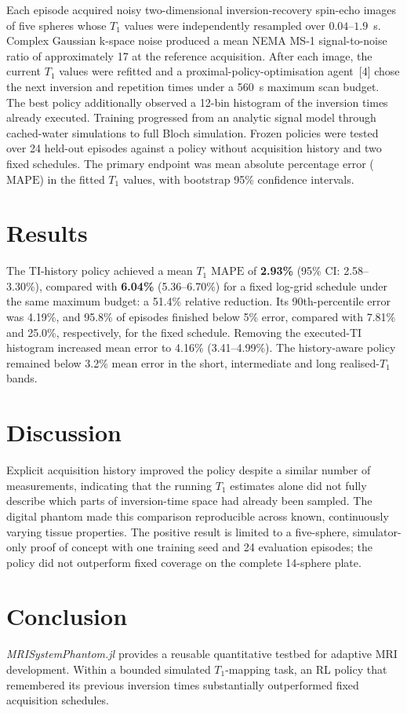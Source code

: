 \documentclass[10pt,a4paper]{article}
\newcommand{\mape}{\mathrm{MAPE}}
\begin{document}
Each episode acquired noisy two-dimensional inversion-recovery spin-echo images
of five spheres whose $T_1$ values were independently resampled over
$0.04$--$1.9$~s. Complex Gaussian k-space noise produced a mean NEMA MS-1 signal-to-noise
ratio of approximately 17 at the reference acquisition. After each image, the
current $T_1$ values were refitted and a proximal-policy-optimisation agent~[4] chose
the next inversion and repetition times under a 560~s maximum scan budget. The
best policy additionally observed a 12-bin histogram of the inversion times
already executed. Training progressed from an analytic signal model through
cached-water simulations to full Bloch simulation. Frozen policies were tested
over 24 held-out episodes against a policy without acquisition history and two
fixed schedules. The primary endpoint was mean absolute percentage error
($\mape$) in the fitted $T_1$ values, with bootstrap 95\% confidence intervals.

\section{Results}
The TI-history policy achieved a mean $T_1$ $\mape$ of \textbf{2.93\%}
(95\% CI: 2.58--3.30\%), compared with \textbf{6.04\%}
(5.36--6.70\%) for a fixed log-grid schedule under the same maximum budget: a 51.4\% relative
reduction. Its 90th-percentile error was 4.19\%, and 95.8\% of episodes finished
below 5\% error, compared with 7.81\% and 25.0\%, respectively, for the fixed
schedule. Removing the executed-TI histogram increased mean error to 4.16\%
(3.41--4.99\%). The history-aware policy remained below 3.2\% mean error in the
short, intermediate and long realised-$T_1$ bands.

\section{Discussion}
Explicit acquisition history improved the policy despite a similar number of
measurements, indicating that the running $T_1$ estimates alone did not fully
describe which parts of inversion-time space had already been sampled. The
digital phantom made this comparison reproducible across known, continuously
varying tissue properties. The positive result is limited to a five-sphere,
simulator-only proof of concept with one training seed and 24 evaluation
episodes; the policy did not outperform fixed coverage on the complete
14-sphere plate.

\section{Conclusion}
\textit{MRISystemPhantom.jl} provides a reusable quantitative testbed for
adaptive MRI development. Within a bounded simulated $T_1$-mapping task, an RL
policy that remembered its previous inversion times substantially outperformed
fixed acquisition schedules.
\end{document}
